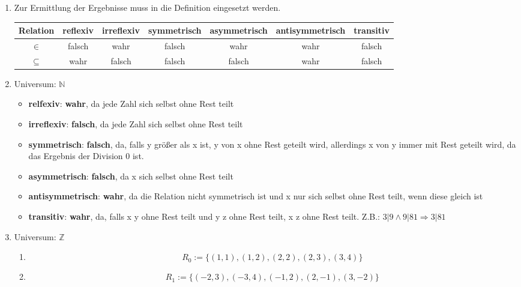 \documentclass[a4paper]{article}
\begin{document}
\begin{enumerate}
		\item
		Zur Ermittlung der Ergebnisse muss in die Definition eingesetzt werden.
		\newline
		\begin{tabular}{|c|c|c|c|c|c|c|}
			\firsthline
				Relation & reflexiv & irreflexiv & symmetrisch & asymmetrisch & antisymmetrisch & transitiv \\
			\hline
				$\in$ & falsch & wahr & falsch & wahr & wahr & falsch \\
			\hline
				$\subseteq$ & wahr & falsch & falsch & falsch & wahr & falsch \\
			\hline
		\end{tabular}
		
		\clearpage
		\item
		Universum: $\mathbb{N}$
		\begin{itemize}
			\item \textbf{relfexiv}: \textbf{wahr}, da jede Zahl sich selbst ohne Rest teilt
			\item \textbf{irreflexiv}: \textbf{falsch}, da jede Zahl sich selbst ohne Rest teilt
			\item \textbf{symmetrisch}: \textbf{falsch}, da, falls y größer als x ist, y von x ohne Rest geteilt wird, allerdings x von y immer mit Rest geteilt wird, da das Ergebnis der Division 0 ist.
			\item \textbf{asymmetrisch}: \textbf{falsch}, da x sich selbst ohne Rest teilt
			\item \textbf{antisymmetrisch}: \textbf{wahr}, da die Relation nicht symmetrisch ist und x nur sich selbst ohne Rest teilt, wenn diese gleich ist
			\item \textbf{transitiv}: \textbf{wahr}, da, falls x y ohne Rest teilt und y z ohne Rest teilt, x z ohne Rest teilt. Z.B.: $3 | 9 \land 9 | 81 \Rightarrow 3 | 81$
		\end{itemize}
		
		\item
		Universum: $\mathbb{Z}$
		\begin{enumerate}
			\item
			\begin{equation*}
				R_{0} := \{(1, 1), (1, 2), (2, 2), (2, 3), (3, 4)\}
			\end{equation*}
			
			\item
			\begin{equation*}
				R_{1} := \{(-2, 3), (-3, 4), (-1, 2), (2, -1), (3, -2)\}
			\end{equation*}
		\end{enumerate}
		

\end{enumerate}
\end{document}
